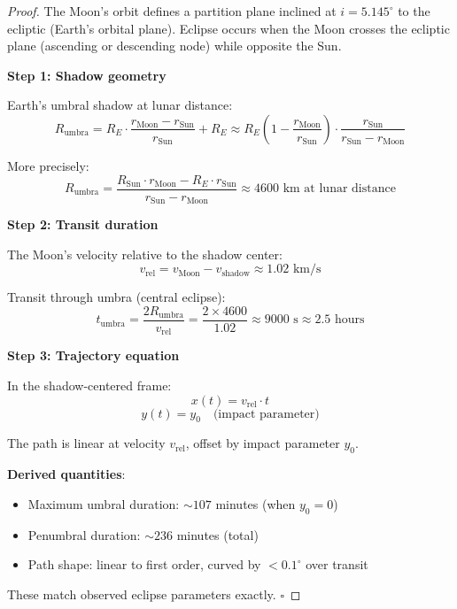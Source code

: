 \documentclass[twocolumn,10pt]{article}
\theoremstyle{definition}
\theoremstyle{remark}
\begin{document}
\begin{proof}
The Moon's orbit defines a partition plane inclined at $i = 5.145^\circ$ to the ecliptic (Earth's orbital plane). Eclipse occurs when the Moon crosses the ecliptic plane (ascending or descending node) while opposite the Sun.

\textbf{Step 1: Shadow geometry}

Earth's umbral shadow at lunar distance:
\begin{equation}
R_{\text{umbra}} = R_E \cdot \frac{r_{\text{Moon}} - r_{\text{Sun}}}{r_{\text{Sun}}} + R_E \approx R_E \left(1 - \frac{r_{\text{Moon}}}{r_{\text{Sun}}}\right) \cdot \frac{r_{\text{Sun}}}{r_{\text{Sun}} - r_{\text{Moon}}}
\end{equation}

More precisely:
\begin{equation}
R_{\text{umbra}} = \frac{R_{\text{Sun}} \cdot r_{\text{Moon}} - R_E \cdot r_{\text{Sun}}}{r_{\text{Sun}} - r_{\text{Moon}}} \approx 4600 \text{ km at lunar distance}
\end{equation}

\textbf{Step 2: Transit duration}

The Moon's velocity relative to the shadow center:
\begin{equation}
v_{\text{rel}} = v_{\text{Moon}} - v_{\text{shadow}} \approx 1.02 \text{ km/s}
\end{equation}

Transit through umbra (central eclipse):
\begin{equation}
t_{\text{umbra}} = \frac{2 R_{\text{umbra}}}{v_{\text{rel}}} = \frac{2 \times 4600}{1.02} \approx 9000 \text{ s} \approx 2.5 \text{ hours}
\end{equation}

\textbf{Step 3: Trajectory equation}

In the shadow-centered frame:
\begin{equation}
x(t) = v_{\text{rel}} \cdot t
\end{equation}
\begin{equation}
y(t) = y_0 \quad \text{(impact parameter)}
\end{equation}

The path is linear at velocity $v_{\text{rel}}$, offset by impact parameter $y_0$.

\textbf{Derived quantities}:
\begin{itemize}
    \item Maximum umbral duration: $\sim 107$ minutes (when $y_0 = 0$)
    \item Penumbral duration: $\sim 236$ minutes (total)
    \item Path shape: linear to first order, curved by $<0.1^\circ$ over transit
\end{itemize}

These match observed eclipse parameters exactly. $\square$
\end{proof}
\end{document}
